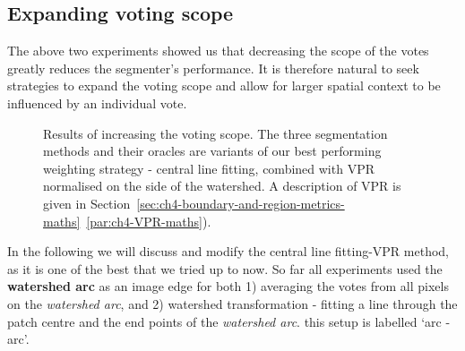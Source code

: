 \subsection{Expanding voting scope}
The above two experiments showed us that decreasing the scope of the votes greatly reduces the segmenter's performance. It is therefore natural to seek strategies to expand the voting scope and allow for larger spatial context to be influenced by an individual vote.

\begin{figure}[t]
\centering
\caption[Increasing the voting scope - plots]{Results of increasing the voting scope. The three segmentation methods and their oracles are variants of our best performing weighting strategy - central line fitting, combined with VPR normalised on the side of the watershed. A description of VPR is given in Section~\ref*{sec:ch4-boundary-and-region-metrics-maths}~\ref{par:ch4-VPR-maths}).}
\label{fig:voting-scope-line-centre-VPR-ws}
\end{figure}

In the following we will discuss and modify the central line fitting-VPR method, as it is one of the best that we tried up to now. %
So far all experiments used the {\bf watershed arc} as an image edge for both 1) averaging the votes from all pixels on the %
{\it watershed arc}, and 2) watershed transformation - fitting a line through the patch centre and the end points of the {\it watershed arc}.  this setup is labelled `arc - arc'.

